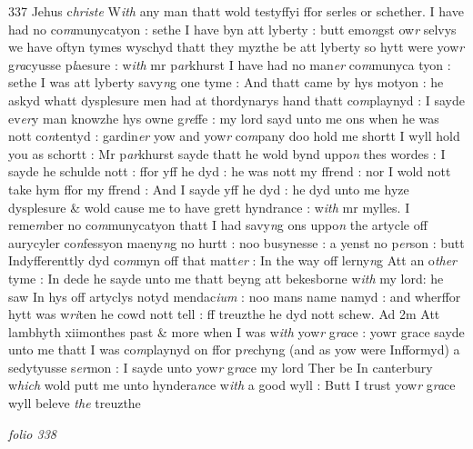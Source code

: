 \documentclass[12pt, a4paper]{book}
\begin{document}
{\color{Mahogany}337} Jehus c\textit{hriste} W\textit{ith} any man thatt wold testyffyi ffor serles or schether. I have had no co\textit{m}munycatyon : sethe I have byn att lyberty : butt emo\textit{n}gst ow\textit{r} selvys we have oftyn tymes wyschyd thatt they myzthe be att lyberty so hytt were yow\textit{r }g\textit{ra}cyusse  p\textit{l}aesure : w\textit{ith} mr p\textit{ar}khurst I have had no man\textit{er} co\textit{m}munyca tyon : sethe I was att
			 lyberty savy\textit{n}g one tyme : And thatt came by hys motyon : he askyd whatt dysplesure men had at thordynarys hand thatt co\textit{m}playnyd : I sayde ev\textit{er}y man knowzhe hys owne g\textit{re}ffe : my lord sayd unto me ons when  he was nott co\textit{n}tentyd : gardin\textit{er} yow and yow\textit{r} co\textit{m}pany doo hold me shortt I wyll hold you as schortt : Mr p\textit{ar}khurst sayde thatt he wold bynd uppo\textit{n} thes wordes : I sayde he schulde nott : ffor yff he dyd : he was nott my ffrend : nor I wold nott take hym ffor my ffrend : And I sayde yff he dyd : he dyd unto me hyze dysplesure \& wold cause me to have grett hyndrance : w\textit{ith} mr mylles. I reme\textit{m}ber no co\textit{m}munycatyon thatt I had savy\textit{n}g ons uppo\textit{n} the artycle off aurycyler co\textit{n}fessyon maeny\textit{n}g no hurtt : noo busynesse : a yenst no p\textit{er}son : butt Indyfferenttly dyd co\textit{m}myn off that matt\textit{er} : In the way off lerny\textit{n}g Att an o\textit{ther} tyme : In dede he sayde unto me thatt beyng att  bekesborne w\textit{ith} my lord: he saw In hys off artyclys notyd mendac\textit{ium} : noo mans name namyd : and wherffor hytt was w\textit{ri}ten he cowd nott tell : ff treuzthe he dyd nott schew.  Ad 2m Att lambhyth xiimonthes past \& more
			 when I was w\textit{ith} yow\textit{r} g\textit{ra}ce : yowr grace sayde unto me thatt I was co\textit{m}playnyd on ffor p\textit{re}chyng (and as  yow were Infformyd) a sedytyusse s\textit{er}mon : I sayde unto yow\textit{r} g\textit{ra}ce  my lord Ther be In canterbury w\textit{hich} wold putt me unto hyndera\textit{n}ce w\textit{ith} a good wyll : Butt I trust yow\textit{r} g\textit{ra}ce wyll beleve \textit{the }treuzthe

\dotfill
					

\textit{folio 338}
\end{document}
